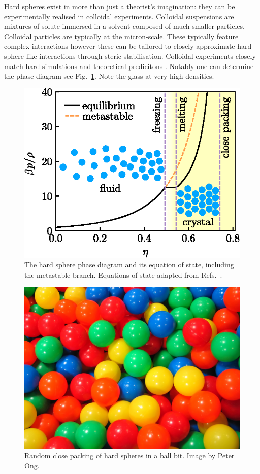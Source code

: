 \documentclass[11pt,twoside]{report}
\begin{document}
Hard spheres exist in more than just a theorist's imagination: they can be experimentally realised in colloidal experiments.
Colloidal suspensions are mixtures of solute immersed in a solvent composed of much smaller particles.
Colloidal particles are typically at the micron-scale.
These typically feature complex interactions \cite{Royall?,?,?} however these can be tailored to closely approximate hard sphere like interactions through steric stabilisation.
Colloidal experiments closely match hard simulations and theoretical predicitons \cite{?}.
Notably one can determine the phase diagram see Fig.\ \ref{fig:hs-phase-diagram}.
Note the glass at very high densities.

\begin{figure}
  \includegraphics[width=0.75\linewidth,outer]{hs-phase-diagram}
  \caption[The hard sphere phase diagram]{
    The hard sphere phase diagram and its equation of state, including the metastable branch.
    Equations of state adapted from Refs.\ \cite{CarnahanJCP1969,SpeedyJPCM1998,BannermanJCP2010}.
  }
  \label{fig:hs-phase-diagram}
\end{figure}

\begin{figure}
  \includegraphics[width=0.75\linewidth,outer]{ball-pit-horizontal}
  \caption[Random close packing in a ball pit]{
    Random close packing of hard spheres in a ball bit.
    Image by Peter Ong.}
  \label{fig:rcp}
\end{figure}
\end{document}
